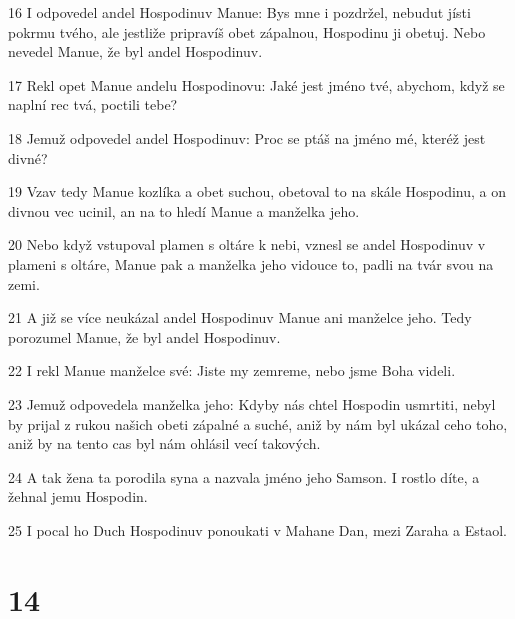 \par 16 I odpovedel andel Hospodinuv Manue: Bys mne i pozdržel, nebudut jísti pokrmu tvého, ale jestliže pripravíš obet zápalnou, Hospodinu ji obetuj. Nebo nevedel Manue, že byl andel Hospodinuv.
\par 17 Rekl opet Manue andelu Hospodinovu: Jaké jest jméno tvé, abychom, když se naplní rec tvá, poctili tebe?
\par 18 Jemuž odpovedel andel Hospodinuv: Proc se ptáš na jméno mé, kteréž jest divné?
\par 19 Vzav tedy Manue kozlíka a obet suchou, obetoval to na skále Hospodinu, a on divnou vec ucinil, an na to hledí Manue a manželka jeho.
\par 20 Nebo když vstupoval plamen s oltáre k nebi, vznesl se andel Hospodinuv v plameni s oltáre, Manue pak a manželka jeho vidouce to, padli na tvár svou na zemi.
\par 21 A již se více neukázal andel Hospodinuv Manue ani manželce jeho. Tedy porozumel Manue, že byl andel Hospodinuv.
\par 22 I rekl Manue manželce své: Jiste my zemreme, nebo jsme Boha videli.
\par 23 Jemuž odpovedela manželka jeho: Kdyby nás chtel Hospodin usmrtiti, nebyl by prijal z rukou našich obeti zápalné a suché, aniž by nám byl ukázal ceho toho, aniž by na tento cas byl nám ohlásil vecí takových.
\par 24 A tak žena ta porodila syna a nazvala jméno jeho Samson. I rostlo díte, a žehnal jemu Hospodin.
\par 25 I pocal ho Duch Hospodinuv ponoukati v Mahane Dan, mezi Zaraha a Estaol.

\chapter{14}

